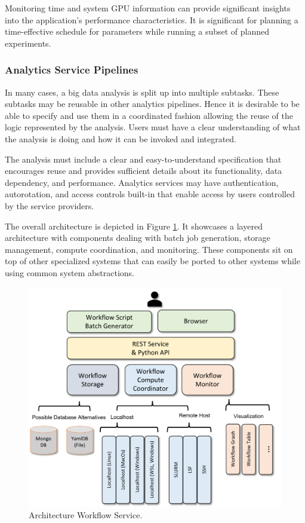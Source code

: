 \documentclass[utf8]{FrontiersinVancouver} %
\begin{document}
Monitoring time and system GPU information can provide significant
insights into the application's performance characteristics. It is
significant for planning a time-effective schedule for parameters
while running a subset of planned experiments.



\subsubsection{Analytics Service Pipelines}

In many cases, a big data analysis is split up into multiple
subtasks. These subtasks may be reusable in other analytics
pipelines. Hence it is desirable to be able to specify and use them in
a coordinated fashion allowing the reuse of the logic represented by
the analysis. Users must have a clear understanding of what the
analysis is doing and how it can be invoked and integrated.

The analysis must include a clear and easy-to-understand specification
that encourages reuse and provides sufficient details about its
functionality, data dependency, and performance. Analytics services
may have authentication, autorotation, and access controls built-in
that enable access by users controlled by the service providers.

The overall architecture is depicted in Figure \ref{fig:cc-2}. It
showcases a layered architecture with components dealing with batch job
generation, storage management, compute coordination, and
monitoring. These components sit on top of other specialized systems
that can easily be ported to other systems while using common system
abstractions.

\begin{figure}[htb]
    \centering
    \includegraphics[width=0.50\columnwidth]{images/cloudmesh-cc-new.pdf}
    \caption{Architecture Workflow Service.}
    \label{fig:cc-2}
\end{figure}
\end{document}
